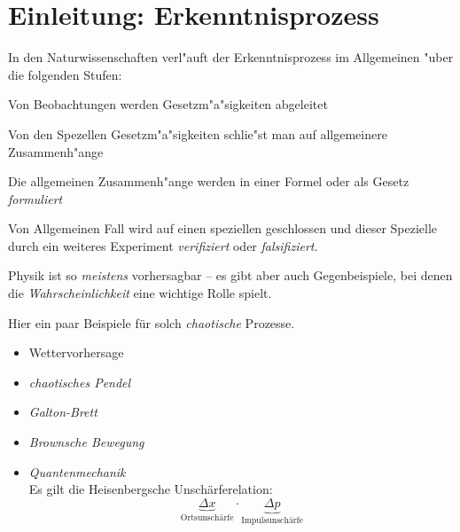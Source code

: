 \chapter{Einleitung: Erkenntnisprozess}

In den Naturwissenschaften verl"auft der Erkenntnisprozess im
Allgemeinen "uber die folgenden Stufen:

\begin{description}[\setlabelstyle{\bfseries\slshape}]
\item[Experiment] Von Beobachtungen werden Gesetzm"a"sigkeiten
   abgeleitet
\item[Induktion] Von den Spezellen Gesetzm"a"sigkeiten schlie"st man auf
   allgemeinere Zusammenh"ange
\item[Formulierung] Die allgemeinen Zusammenh"ange werden in einer
   Formel oder als Gesetz \emph{formuliert}
\item[Deduktion] Von Allgemeinen Fall wird auf einen speziellen
   geschlossen und dieser Spezielle durch ein weiteres Experiment
   \emph{verifiziert} oder \emph{falsifiziert}.
\end{description}

Physik ist so \emph{meistens} vorhersagbar -- es gibt aber auch
Gegenbeispiele, bei denen die \emph{Wahrscheinlichkeit} eine wichtige
Rolle spielt.

\begin{Beispiel}
Hier ein paar Beispiele für solch \emph{chaotische} Prozesse.
 \begin{itemize}
\item Wettervorhersage
\item \emph{chaotisches Pendel}
\item \emph{Galton-Brett}
\item \emph{Brownsche Bewegung}


\item \emph{Quantenmechanik}\\
Es gilt die Heisenbergsche Unschärferelation:
\[
\underbrace{\Delta x}_{\text{Ortsunschärfe}} \cdot \underbrace{\Delta p}_{\text{Impulsunschärfe}}
\]
\end{itemize}
\end{Beispiel}
















